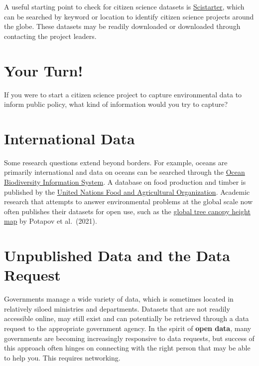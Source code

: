 \documentclass[
]{book}
\begin{document}
A useful starting point to check for citizen science datasets is \href{https://scistarter.org/}{Scistarter}, which can be searched by keyword or location to identify citizen science projects around the globe. These datasets may be readily downloaded or downloaded through contacting the project leaders.

\hypertarget{your-turn-3}{%
\section*{Your Turn!}\label{your-turn-3}}

If you were to start a citizen science project to capture environmental data to inform public policy, what kind of information would you try to capture?

\hypertarget{international-data}{%
\section{International Data}\label{international-data}}

Some research questions extend beyond borders. For example, oceans are primarily international and data on oceans can be searched through the \href{https://obis.org/}{Ocean Biodiversity Information System}. A database on food production and timber is published by the \href{http://www.fao.org/faostat/en/}{United Nations Food and Agricultural Organization}. Academic research that attempts to answer environmental problems at the global scale now often publishes their datasets for open use, such as the \href{https://glad.umd.edu/dataset/gedi}{global tree canopy height map} by Potapov et al.~(2021).

\hypertarget{unpublished-data-and-the-data-request}{%
\section{Unpublished Data and the Data Request}\label{unpublished-data-and-the-data-request}}

Governments manage a wide variety of data, which is sometimes located in relatively siloed ministries and departments. Datasets that are not readily accessible online, may still exist and can potentially be retrieved through a data request to the appropriate government agency. In the spirit of \textbf{open data}, many governments are becoming increasingly responsive to data requests, but success of this approach often hinges on connecting with the right person that may be able to help you. This requires networking.
\end{document}
